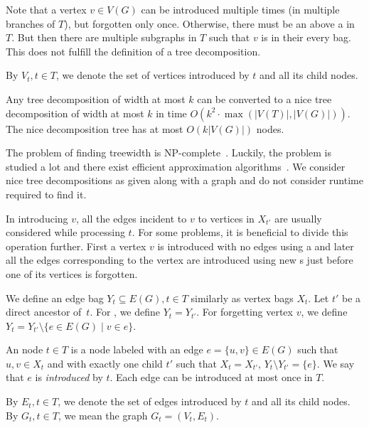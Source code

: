
Note that a vertex \( v \in V(G) \) can be introduced multiple times
(in multiple branches of \( T \)),
but forgotten only once.
%
Otherwise, there must be an \IntroduceVertexNode{} above a \ForgetVertexNode{} in~\( T \).
But then there are multiple subgraphs in \( T \)
such that \( v \) is in their every bag.
This does not fulfill the definition of a tree decomposition.

By \( V_t, t \in T \), we denote the set of vertices introduced by \( t \)
and all its child nodes.
%
\begin{lemma}
	Any tree decomposition of width at most \( k \) can be converted to
	a nice tree decomposition of width at most \( k \)
	in time \( O(k^2 \cdot \max(|V(T)|, |V(G)|)) \).
	The nice decomposition tree has at most \( O(k|V(G)|) \) nodes.
\end{lemma}

The problem of finding treewidth is NP-complete~\cite{tree_width_np_complete}.
Luckily, the problem is studied a lot and
there exist efficient approximation algorithms~\cite{tree_width_approximation}.
We consider nice tree decompositions as given along with a graph
and do not consider runtime required to find it.

In \IntroduceVertexNode{} introducing \( v \), all the edges incident to \( v \)
to vertices in \( X_{t'} \) are usually considered while processing \( t \).
%
For some problems, it is beneficial to divide this operation further.
First a vertex \( v \) is introduced with no edges using a \IntroduceVertexNode{}
and later all the edges corresponding to the vertex are introduced using new \IntroduceEdgeNode{}s
just before one of its vertices is forgotten.

We define an edge bag \( Y_t \subseteq E(G), t \in T \) similarly as vertex bags \( X_t \).
%
Let \( t' \) be a direct ancestor of~\( t \).
For \IntroduceVertexNode{}, we define \( Y_t = Y_{t'} \).
For \ForgetVertexNode{} forgetting vertex \( v \),
we define \( Y_t = Y_{t'} \setminus \{ e \in E(G) \mid v \in e\} \).
%
\begin{definition}
	An \IntroduceEdgeNode{} node \( t \in T \) is a node
	labeled with an edge \( e = \{u, v\} \in E(G) \)
	such that \( u, v \in X_t \) and with exactly one child \( t' \)
	such that \( X_t = X_{t'} \), \( Y_t \setminus Y_{t'} = \{e\} \).
	We say that \( e \) is \emph{introduced} by \( t \).
	Each edge can be introduced at most once in \( T \).
\end{definition}
%
By \( E_t, t \in T \), we denote the set of edges introduced by \( t \)
and all its child nodes.
By \( G_t, t \in T \), we mean the graph \( G_t = (V_t, E_t) \).

